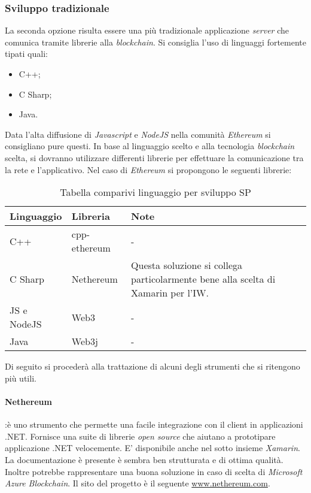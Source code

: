\subsubsection{Sviluppo tradizionale}
La seconda opzione risulta essere una più tradizionale applicazione \emph{server} che comunica tramite librerie alla \emph{blockchain}. Si consiglia l’uso di linguaggi fortemente tipati quali: 
\begin{itemize}
    \item C++;
    \item C Sharp;
    \item Java.
\end{itemize}
Data l’alta diffusione di \emph{Javascript} e \emph{NodeJS} nella comunità \emph{Ethereum} si consigliano pure questi.
In base al linguaggio scelto e alla tecnologia \emph{blockchain} scelta, si dovranno utilizzare differenti librerie per effettuare la comunicazione tra la rete e l’applicativo. Nel caso di \emph{Ethereum} si propongono le seguenti librerie:
\begin{table}[!h] %
    \caption{Tabella comparivi linguaggio per sviluppo SP}
    \label{tab:comp-ling}
    \begin{tabularx}{\textwidth}{|l|l|l|X|}
    \hline
    \textbf{Linguaggio} & \textbf{Libreria} & \textbf{Note}\\
    \hline
    C++   & cpp-ethereum & - \\
    \hline
    C Sharp   & Nethereum & Questa soluzione si collega particolarmente bene alla scelta di Xamarin per l’IW. \\
    \hline
    JS e NodeJS   & Web3 & -\\
    \hline
    Java  & Web3j & -\\
    \hline
    \end{tabularx}
\end{table}%

Di seguito si procederà alla trattazione di alcuni degli strumenti che si ritengono più utili.
\paragraph{Nethereum}:è uno strumento che permette una facile integrazione con il client in applicazioni .NET. Fornisce una suite di librerie \emph{open source} che aiutano a prototipare applicazione .NET velocemente. E’ disponibile anche nel sotto insieme \emph{Xamarin}.  La documentazione è presente è sembra ben strutturata e di ottima qualità. Inoltre potrebbe rappresentare una buona soluzione in caso di scelta di \emph{Microsoft Azure Blockchain}. Il sito del progetto è il seguente \url{www.nethereum.com}.   
